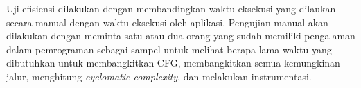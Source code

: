 Uji efisiensi dilakukan dengan membandingkan waktu eksekusi yang dilaukan secara manual dengan waktu eksekusi oleh aplikasi. Pengujian manual akan dilakukan dengan meminta satu atau dua orang yang sudah memiliki pengalaman dalam pemrograman sebagai sampel  untuk melihat berapa lama waktu yang dibutuhkan untuk membangkitkan CFG, membangkitkan semua kemungkinan jalur,  menghitung \textit{cyclomatic complexity}, dan melakukan instrumentasi.
